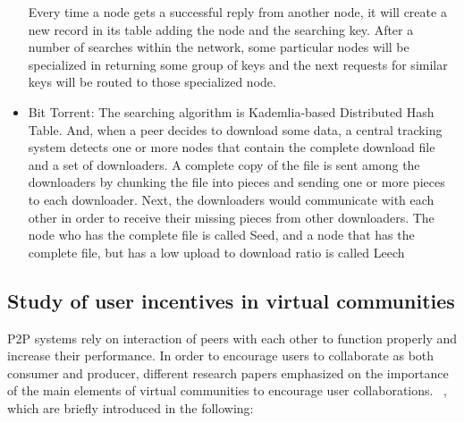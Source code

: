 \documentclass [12pt]{article} \usepackage{multicol}
\begin{document}
\begin{itemize}
	Every time a node gets a successful reply from another node,
	it will create a new record in its table adding the node and
	the searching key. After a number of searches within the
	network, some particular nodes will be specialized in
	returning some group of keys and the next requests for
	similar keys will be routed to those specialized node.

		\item Bit Torrent: The searching algorithm is Kademlia-based
	Distributed Hash Table. And, when a peer decides to download
	some data, a central tracking system detects one or more nodes
	that contain the complete download file and a set of downloaders.
	A complete copy of the file is sent among the downloaders by
	chunking the file into pieces and sending one or more pieces to
	each downloader. Next, the downloaders would communicate with
	each other in order to receive their missing pieces from other
	downloaders. The node who has the complete file is called Seed,
	and a node that has the complete file, but has a low upload to
	download ratio is called Leech ~\cite{cohen2003incentives}
	\end{itemize}
	 



\subsection{Study of user incentives in virtual communities}

		P2P systems rely on interaction of peers with each other to
	function properly and increase their performance. In order to
	encourage users  to collaborate as both consumer and producer,
	different research papers emphasized on the importance of the
	main elements of virtual communities to encourage user
	collaborations. ~\cite{antoniadis2009self}, which are briefly
	introduced in the following: 
	
\end{document}
